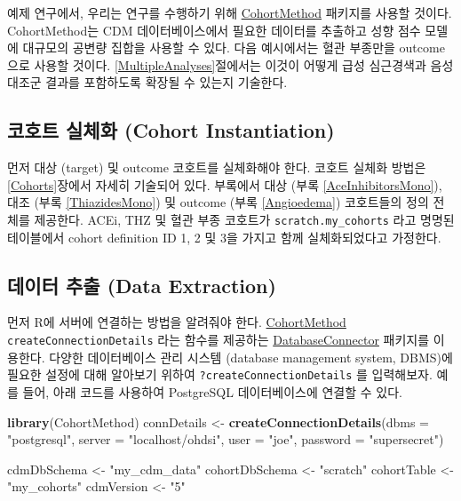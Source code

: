 \documentclass[11pt]{book}
\newenvironment{Shaded}{\begin{snugshade}}{\end{snugshade}}
\newcommand{\KeywordTok}[1]{\textcolor[rgb]{0.13,0.29,0.53}{\textbf{#1}}}
\newcommand{\DataTypeTok}[1]{\textcolor[rgb]{0.13,0.29,0.53}{#1}}
\newcommand{\StringTok}[1]{\textcolor[rgb]{0.31,0.60,0.02}{#1}}
\newcommand{\NormalTok}[1]{#1}
\theoremstyle{definition}
\theoremstyle{definition}
\theoremstyle{definition}
\theoremstyle{remark}
\begin{document}
예제 연구에서, 우리는 연구를 수행하기 위해
\href{https://ohdsi.github.io/CohortMethod/}{CohortMethod} 패키지를
사용할 것이다. CohortMethod는 CDM 데이터베이스에서 필요한 데이터를
추출하고 성향 점수 모델에 대규모의 공변량 집합을 사용할 수 있다. 다음
예시에서는 혈관 부종만을 outcome으로 사용할 것이다.
\ref{MultipleAnalyses}절에서는 이것이 어떻게 급성 심근경색과 음성 대조군
결과를 포함하도록 확장될 수 있는지 기술한다.

\subsection{코호트 실체화 (Cohort
Instantiation)}\label{--cohort-instantiation}

먼저 대상 (target) 및 outcome 코호트를 실체화해야 한다. 코호트 실체화
방법은 \ref{Cohorts}장에서 자세히 기술되어 있다. 부록에서 대상 (부록
\ref{AceInhibitorsMono}), 대조 (부록 \ref{ThiazidesMono}) 및 outcome
(부록 \ref{Angioedema}) 코호트들의 정의 전체를 제공한다. ACEi, THZ 및
혈관 부종 코호트가 \texttt{scratch.my\_cohorts} 라고 명명된 테이블에서
cohort definition ID 1, 2 및 3을 가지고 함께 실체화되었다고 가정한다.

\subsection{데이터 추출 (Data Extraction)}\label{--data-extraction-1}

먼저 R에 서버에 연결하는 방법을 알려줘야 한다.
\href{https://ohdsi.github.io/CohortMethod/}{CohortMethod}
\texttt{createConnectionDetails} 라는 함수를 제공하는
\href{https://ohdsi.github.io/DatabaseConnector/}{DatabaseConnector}
패키지를 이용한다. 다양한 데이터베이스 관리 시스템 (database management
system, DBMS)에 필요한 설정에 대해 알아보기 위하여
\texttt{?createConnectionDetails} 를 입력해보자. 예를 들어, 아래 코드를
사용하여 PostgreSQL 데이터베이스에 연결할 수 있다.

\begin{Shaded}
\begin{Highlighting}[]
\KeywordTok{library}\NormalTok{(CohortMethod)}
\NormalTok{connDetails <-}\StringTok{ }\KeywordTok{createConnectionDetails}\NormalTok{(}\DataTypeTok{dbms =} \StringTok{"postgresql"}\NormalTok{,}
                                       \DataTypeTok{server =} \StringTok{"localhost/ohdsi"}\NormalTok{,}
                                       \DataTypeTok{user =} \StringTok{"joe"}\NormalTok{,}
                                       \DataTypeTok{password =} \StringTok{"supersecret"}\NormalTok{)}

\NormalTok{cdmDbSchema <-}\StringTok{ "my_cdm_data"}
\NormalTok{cohortDbSchema <-}\StringTok{ "scratch"}
\NormalTok{cohortTable <-}\StringTok{ "my_cohorts"}
\NormalTok{cdmVersion <-}\StringTok{ "5"}
\end{Highlighting}
\end{Shaded}
\end{document}
